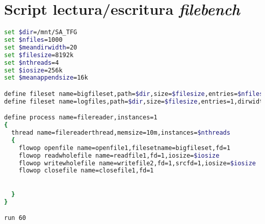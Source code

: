 \section{Script lectura/escritura \textit{filebench}}\label{wml.f}
\begin{lstlisting}[language=bash] 
set $dir=/mnt/SA_TFG
set $nfiles=1000
set $meandirwidth=20
set $filesize=8192k
set $nthreads=4
set $iosize=256k
set $meanappendsize=16k

define fileset name=bigfileset,path=$dir,size=$filesize,entries=$nfiles,dirwidth=$meandirwidth,prealloc=100
define fileset name=logfiles,path=$dir,size=$filesize,entries=1,dirwidth=$meandirwidth,prealloc

define process name=filereader,instances=1
{
  thread name=filereaderthread,memsize=10m,instances=$nthreads
  {
    flowop openfile name=openfile1,filesetname=bigfileset,fd=1
    flowop readwholefile name=readfile1,fd=1,iosize=$iosize
    flowop writewholefile name=writefile2,fd=1,srcfd=1,iosize=$iosize
    flowop closefile name=closefile1,fd=1

 
  }
}

run 60

\end{lstlisting}